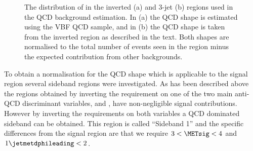 \begin{figure}
  \caption{The distribution of \METsig in the inverted (a) and 3-jet (b) regions used in the \ac{QCD} background estimation. In (a) the \ac{QCD} shape is estimated using the \ac{VBF} \ac{QCD} sample, and in (b) the \ac{QCD} shape is taken from the inverted region as described in the text. Both shapes are normalised to the total number of events seen in the region minus the expected contribution from other backgrounds.}
  \label{fig:parkeddataqcd}
\end{figure}

To obtain a normalisation for the \ac{QCD} shape which is applicable to the signal region several sideband regions were investigated. As has been described above the regions obtained by inverting the requirement on one of the two main anti-\ac{QCD} discriminant variables, \jetmetdphi and \METsig, have non-negligible signal contributions. However by inverting the requirements on both variables a \ac{QCD} dominated sideband can be obtained. This region is called ``Sideband 1'' and the specific differences from the signal region are that we require $3<\METsig<4$ and $1\jetmetdphileading<2$.  

